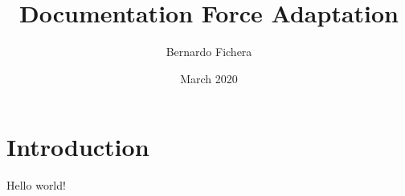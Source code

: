 \documentclass[12pt]{article}
\title{Documentation Force Adaptation}
\author{Bernardo Fichera}
\date{March 2020}
\begin{document}
\maketitle

\section*{Introduction}

Hello world!
\end{document}
